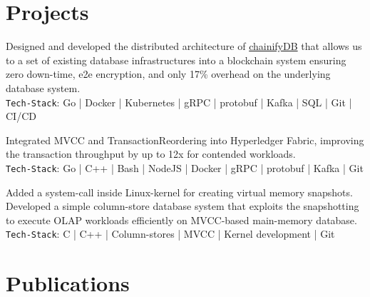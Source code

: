 \documentclass[]{deedy-resume-openfont}
\begin{document}
\begin{minipage}[t]{0.66\textwidth}

\section{Projects}
Designed and developed the distributed architecture of \href{www.chainifydb.com}{chainifyDB} that allows us to a set of existing database infrastructures into a 
blockchain system ensuring zero down-time, e2e encryption, and only 17\% overhead on the underlying database system.\\
\texttt{Tech-Stack}: Go | Docker | Kubernetes | gRPC | protobuf | Kafka | SQL | Git | CI/CD

\sectionsep

Integrated MVCC and TransactionReordering into Hyperledger Fabric, improving the transaction throughput by up to 12x for contended workloads.\\
\texttt{Tech-Stack}: Go | C++ | Bash | NodeJS | Docker | gRPC | protobuf | Kafka | Git

\sectionsep

Added a system-call inside Linux-kernel for creating virtual memory snapshots. Developed a simple column-store database system that exploits the snapshotting to execute OLAP workloads efficiently on MVCC-based main-memory database.\\
\texttt{Tech-Stack}: C | C++ | Column-stores | MVCC | Kernel development | Git 


\section{Publications} 
\vspace*{0.5cm}
\renewcommand\refname{\vskip -1.5cm} %


\nocite{*}


\end{minipage} 
\end{document}
